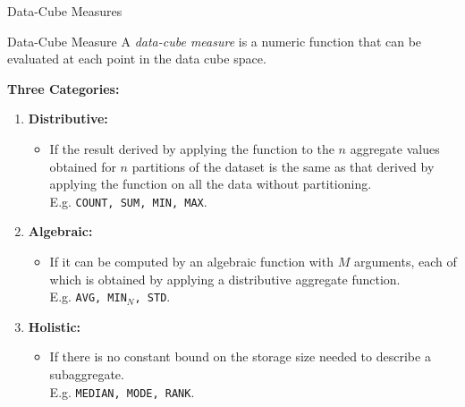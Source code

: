 \begin{frame}{Data-Cube Measures}
	\begin{block}{Data-Cube Measure}
		A \textit{data-cube measure} is a numeric function that can be evaluated at each point in the data cube space.
	\end{block}

	\textbf{Three Categories:}
	\begin{enumerate}
		\item {\color{faugray}\textbf{Distributive:}}
		      \begin{itemize}
			      \item If the result derived by applying the function to the $n$ aggregate values obtained for $n$ partitions of the dataset is the same as that derived by applying the function on all the data without partitioning.\\
			            E.g. \texttt{COUNT, SUM, MIN, MAX}.
		      \end{itemize}
		\item {\color{faugray}\textbf{Algebraic:}}
		      \begin{itemize}
			      \item If it can be computed by an algebraic function with $M$ arguments, each of which is obtained by applying a distributive aggregate function.\\
			            E.g. \texttt{AVG, MIN$_N$, STD}.
		      \end{itemize}
		\item {\color{faugray}\textbf{Holistic:}}
		      \begin{itemize}
			      \item If there is no constant bound on the storage size needed to describe a subaggregate.\\
			            E.g. \texttt{MEDIAN, MODE, RANK}.
		      \end{itemize}
	\end{enumerate}
\end{frame}

